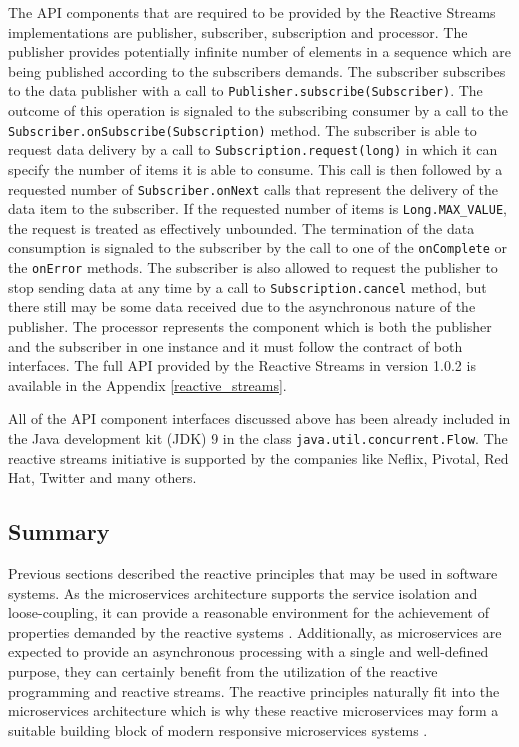 \documentclass[oneside,
  digital, %
  table,   %
  lof,     %
  lot,     %
]{fithesis3}
\begin{document}
The API components that are required to be provided by the Reactive Streams implementations are publisher, subscriber, subscription and processor. The publisher provides potentially infinite number of elements in a sequence which are being published according to the subscribers demands. The subscriber subscribes to the data publisher with a call to \texttt{Publisher.subscribe(Subscriber)}. The outcome of this operation is signaled to the subscribing consumer by a call to the \texttt{Subscriber.onSubscribe(Subscription)} method. The subscriber is  able to request data delivery by a call to \texttt{Subscription.request(long)} in which it can specify the number of items it is able to consume. This call is then followed by a requested number of \texttt{Subscriber.onNext} calls that represent the delivery of the data item to the subscriber. If the requested number of items is \texttt{Long.MAX\_VALUE}, the request is treated as effectively unbounded. The termination of the data consumption is signaled to the subscriber by the call to one of the \texttt{onComplete} or the \texttt{onError} methods. The subscriber is also allowed to request the publisher to stop sending data at any time by a call to \texttt{Subscription.cancel} method, but there still may be some data received due to the asynchronous nature of the publisher. The processor represents the component which is both the publisher and the subscriber in one instance and it must follow the contract of both interfaces. The full API provided by the Reactive Streams in version 1.0.2 is available in the Appendix \ref{reactive_streams}.

All of the API component interfaces discussed above has been already included in the Java development kit (JDK) 9 in the class \texttt{java.util.concurrent.Flow}. The reactive streams initiative is supported by the companies like Neflix, Pivotal, Red Hat, Twitter and many others.

\subsection{Summary}

Previous sections described the reactive principles that may be used in software systems. As the microservices architecture supports the service isolation and loose-coupling, it can provide a reasonable environment for the achievement of properties demanded by the reactive systems \cite{reactive_manifesto}. Additionally, as microservices are expected to provide an asynchronous processing with a single and well-defined purpose, they can certainly benefit from the utilization of the reactive programming and reactive streams. The reactive principles naturally fit into the microservices architecture which is why these reactive microservices may form a suitable building block of modern responsive microservices systems \cite{building_reactive_ms_in_java}.
\end{document}
